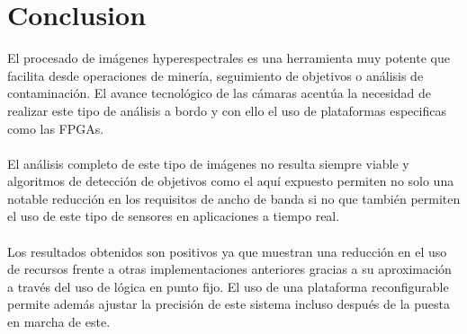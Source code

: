 \cleardoublepage
\chapter{Conclusion}
\label{makereference}
El procesado de imágenes hyperespectrales es una herramienta muy potente que facilita desde operaciones de minería, seguimiento de objetivos o análisis de contaminación. El avance tecnológico de las cámaras acentúa la necesidad de realizar este tipo de análisis a bordo y con ello el uso de plataformas especificas como las FPGAs.
\\
\\
El análisis completo de este tipo de imágenes no resulta siempre viable y algoritmos de detección de objetivos como el aquí expuesto permiten no solo una notable reducción en los requisitos de ancho de banda si no que también permiten el uso de este tipo de sensores en aplicaciones a tiempo real.
\\
\\
Los resultados obtenidos son positivos ya que muestran una reducción en el uso de recursos frente a otras implementaciones anteriores gracias a su aproximación a través del uso de lógica en punto fijo. El uso de una plataforma reconfigurable permite además ajustar la precisión de este sistema incluso después de la puesta en marcha de este.
\\